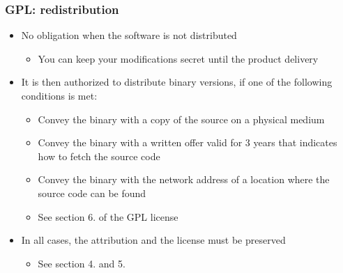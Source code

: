 \begin{frame}
  \frametitle{GPL: redistribution}
  \begin{itemize}
  \item No obligation when the software is not distributed
    \begin{itemize}
    \item You can keep your modifications secret until the product
      delivery
    \end{itemize}
  \item It is then authorized to distribute binary versions, if one of
    the following conditions is met:
    \begin{itemize}
    \item Convey the binary with a copy of the source on a physical
      medium
    \item Convey the binary with a written offer valid for 3 years
      that indicates how to fetch the source code
    \item Convey the binary with the network address of a location
      where the source code can be found
    \item See section 6. of the GPL license
    \end{itemize}
  \item In all cases, the attribution and the license must be
    preserved
    \begin{itemize}
    \item See section 4. and 5.
    \end{itemize}
  \end{itemize}
\end{frame}

